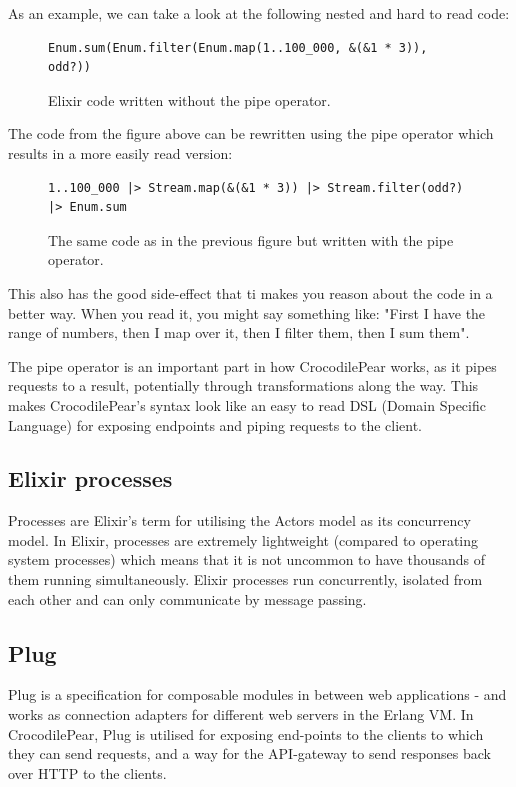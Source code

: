 \documentclass{cslthse-msc}
\begin{document}
As an example, we can take a look at the following nested and hard to read code:

\begin{figure}[H]
  \centering
\begin{lstlisting}[breaklines=true,frame=single]
Enum.sum(Enum.filter(Enum.map(1..100_000, &(&1 * 3)), odd?))
\end{lstlisting}
  \caption{Elixir code written without the pipe operator.}
\end{figure}

The code from the figure above can be rewritten using the pipe operator which results in a more easily read version:

\begin{figure}[H]
  \centering
\begin{lstlisting}[breaklines=true,frame=single]
1..100_000 |> Stream.map(&(&1 * 3)) |> Stream.filter(odd?) |> Enum.sum
\end{lstlisting}
  \caption{The same code as in the previous figure but written with the pipe operator.}
\end{figure}

This also has the good side-effect that ti makes you reason about the code in a better way. When you read it, you might say something like: "First I have the range of numbers, then I map over it, then I filter them, then I sum them".

The pipe operator is an important part in how CrocodilePear works, as it pipes requests to a result, potentially through transformations along the way. This makes CrocodilePear's syntax look like an easy to read DSL (Domain Specific Language) for exposing endpoints and piping requests to the client.

\subsection{Elixir processes}
Processes are Elixir's term for utilising the Actors model as its concurrency model. In Elixir, processes are extremely lightweight (compared to operating system processes) which means that it is not uncommon to have thousands of them running simultaneously. Elixir processes run concurrently, isolated from each other and can only communicate by message passing\cite{elixir_processes}.

\subsection{Plug}
Plug is a specification for composable modules in between web applications - and works as connection adapters for different web servers in the Erlang VM\cite{plug}. In CrocodilePear, Plug is utilised for exposing end-points to the clients to which they can send requests, and a way for the API-gateway to send responses back over HTTP to the clients.
\end{document}
